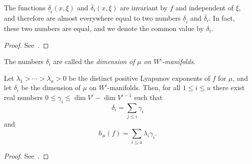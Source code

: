\documentclass[../main]{subfiles}
\begin{document}
\begin{lemma}
  The functions \(\underline{\delta}_i(x,\xi)\) and \(\overline{\delta}_i(x,\xi)\) are invariant by \(f\) and independent of \(\xi\), and therefore are almost everywhere equal to two numbers \(\underline{\delta}_i\) and \(\overline{\delta}_i\). In fact, these two numbers are equal, and we denote the common value by \(\delta_i\).
\end{lemma}

\begin{proof}
  See~\cite{ledrappierMetricEntropyDiffeomorphisms1985a}.
\end{proof}

The numbers \(\delta_i\) are called the \emph{dimension of \(\mu\) on \(W^i\)-manifolds}.

\begin{theorem}\label{thm:leddrappier-young}
  Let \(\lambda_1 > \cdots > \lambda_u > 0\) be the distinct positive Lyapunov exponents of \(f\) for \(\mu\), and let \(\delta_i\) be the dimension of \(\mu\) on \(W^i\)-manifolds. Then, for all \(1 \le i \le u\) there exist real numbers \(0 \le \gamma_i \le \dim V^i - \dim V^{i - 1}\) such that
  \begin{equation*}
    \delta_i = \sum_{j \le i} \gamma_i
  \end{equation*}
  and
  \begin{equation*}
    h_{\mu}(f) = \sum_{i \le u} \lambda_i\gamma_i.
  \end{equation*}
\end{theorem}

\begin{proof}
  See~\cite{ledrappierMetricEntropyDiffeomorphisms1985a}.
\end{proof}
\end{document}
